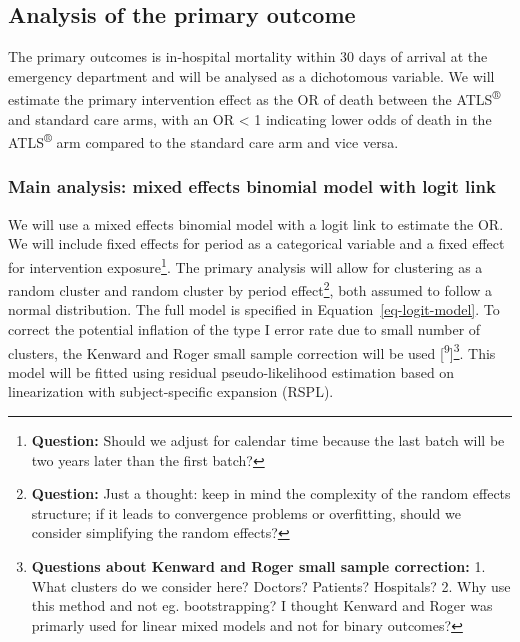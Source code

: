 \documentclass[
]{scrartcl}
\begin{document}
\hypertarget{analysis-of-the-primary-outcome}{%
\subsection{Analysis of the primary
outcome}\label{analysis-of-the-primary-outcome}}

The primary outcomes is in-hospital mortality within 30 days of arrival
at the emergency department and will be analysed as a dichotomous
variable. We will estimate the primary intervention effect as the OR of
death between the ATLS\textsuperscript{®} and standard care arms, with
an OR \textless{} 1 indicating lower odds of death in the
ATLS\textsuperscript{®} arm compared to the standard care arm and vice
versa.

\hypertarget{main-analysis-mixed-effects-binomial-model-with-logit-link}{%
\subsubsection{Main analysis: mixed effects binomial model with logit
link}\label{main-analysis-mixed-effects-binomial-model-with-logit-link}}

We will use a mixed effects binomial model with a logit link to estimate
the OR. We will include fixed effects for period as a categorical
variable and a fixed effect for intervention exposure\footnote{\textbf{Question:}
  Should we adjust for calendar time because the last batch will be two
  years later than the first batch?}. The primary analysis will allow
for clustering as a random cluster and random cluster by period
effect\footnote{\textbf{Question:} Just a thought: keep in mind the
  complexity of the random effects structure; if it leads to convergence
  problems or overfitting, should we consider simplifying the random
  effects?}, both assumed to follow a normal distribution. The full
model is specified in Equation~\ref{eq-logit-model}. To correct the
potential inflation of the type I error rate due to small number of
clusters, the Kenward and Roger small sample correction will be used
{[}\textsuperscript{9}{]}\footnote{\textbf{Questions about Kenward and
  Roger small sample correction:} 1. What clusters do we consider here?
  Doctors? Patients? Hospitals? 2. Why use this method and not eg.
  bootstrapping? I thought Kenward and Roger was primarly used for
  linear mixed models and not for binary outcomes?}. This model will be
fitted using residual pseudo-likelihood estimation based on
linearization with subject-specific expansion (RSPL).
\end{document}
